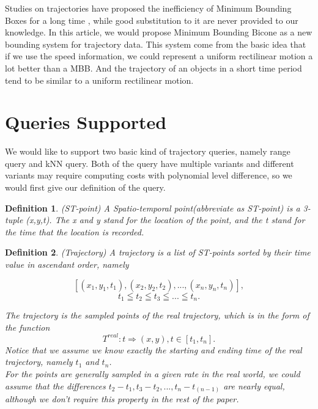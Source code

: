 \documentclass[sigplan]{acmart}
\newtheorem{myDef}{Definition}
\begin{document}
Studies on trajectories have proposed the inefficiency of Minimum Bounding Boxes for a long time \cite{pfoser2000novel}, while good substitution to it are never provided to our knowledge. In this article, we would propose Minimum Bounding Bicone as a new bounding system for trajectory data. This system come from the basic idea that if we use the speed information, we could represent a uniform rectilinear motion a lot better than a MBB. And the trajectory of an objects in a short time period tend to be similar to a uniform rectilinear motion.\par


\section{Queries Supported}
We would like to support two basic kind of trajectory queries, namely range query and kNN query. Both of the query have multiple variants and different variants may require computing costs with polynomial level difference, so we would first give our definition of the query. \par
\begin{myDef}
  (ST-point) A Spatio-temporal point(abbreviate as ST-point) is a 3-tuple (x,y,t). The x and y stand for the location of the point, and the t stand for the time that the location is recorded.
\end{myDef}
\begin{myDef}
  (Trajectory) A trajectory is a list of ST-points sorted by their time value in ascendant order, namely

     $$[(x_1,y_1,t_1),(x_2,y_2,t_2),...,(x_n,y_n,t_n)], $$
     $$t_1 \leqq t_2 \leqq t_3 \leqq ... \leqq t_n .$$

   The trajectory is the sampled points of the real trajectory, which is in the form of the function
   $$T^{real}: t \Rightarrow (x,y), t\in [t_1,t_n].$$
   Notice that we assume we know exactly the starting and ending time of the real trajectory, namely $t_1$ and $t_n$.\\
   For the points are generally sampled in a given rate in the real world, we could assume that the differences $t_2-t_1, t_3-t_2, ... , t_n- t_(n-1)$ are nearly equal, although we don't require this property in the rest of the paper.
\end{myDef}
\end{document}

